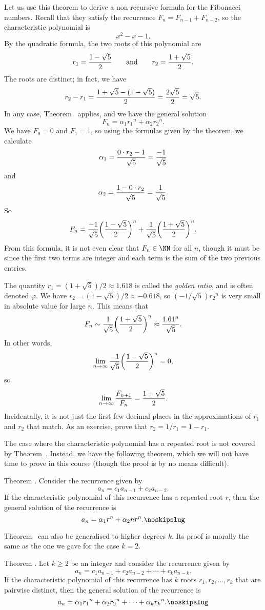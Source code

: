 Let us use this theorem to derive a non-recursive formula for the Fibonacci numbers.
Recall that they satisfy the recurrence $F_n = F_{n-1} + F_{n-2}$, so the characteristic
polynomial is
$$x^2 - x - 1.$$
By the quadratic formula, the two roots of this polynomial are
$$r_1 = {1 - \sqrt 5\over 2}\qquad\hbox{and}\qquad r_2 = {1+\sqrt 5\over 2}.$$
The roots are distinct; in fact, we have
$$r_2 - r_1 = {1+\sqrt 5 - (1-\sqrt 5)\over 2} = {2\sqrt 5\over 2} = \sqrt 5.$$
In any case, Theorem~{\thmdegtwodistinct} applies, and we have the general
solution
$$F_n = \alpha_1 {r_1}^n + \alpha_2 {r_2}^n.$$
We have $F_0 = 0$ and $F_1 = 1$, so using the formulas given by the theorem,
we calculate
$$\alpha_1 = {0\cdot r_2 - 1\over \sqrt 5} = {-1\over \sqrt 5}$$
and
$$\alpha_2 = {1 - 0\cdot r_2\over \sqrt 5} = {1\over \sqrt 5}.$$
So
$$F_n = {-1\over \sqrt 5}\biggl({1 - \sqrt 5\over 2}\biggr)^n
+ {1\over \sqrt 5}\biggl({1+\sqrt 5\over 2}\biggr)^n.$$
From this formula, it is not even clear that $F_n \in \NN$ for all $n$, though it must be
since the first two terms are integer and each term is the sum of the two previous entries.

The quantity $r_1 = (1+\sqrt 5)/2\approx 1.618$ is called the {\it golden ratio}, and is
often denoted $\varphi$.
We have $r_2 = (1-\sqrt 5)/2 \approx -0.618$, so $(-1/\sqrt 5){r_2}^n$ is very small in absolute value
for large $n$.
This means that
$$ F_n \sim {1\over \sqrt 5} \biggl( {1+\sqrt 5\over 2}\biggr)^n \approx {1.61^n\over \sqrt 5}.$$
In other words,
$$\lim_{n\to\infty} {-1\over \sqrt 5}\biggl({1 - \sqrt 5\over 2}\biggr)^n = 0,$$
so
$$\lim_{n\to \infty} {F_{n+1}\over F_n} = {1+\sqrt 5\over 2}.$$
Incidentally, it is not just the first few decimal places in the approximations of $r_1$ and $r_2$
that match. As an exercise, prove that $r_2 = 1/r_1 = 1-r_1$.

The case where the characteristic polynomial has a repeated root is not covered by
Theorem~{\thmdegtwodistinct}. Instead, we have the following theorem, which we will
not have time to prove in this course (though the proof is by no means difficult).

\proclaim Theorem \advthm. Consider the recurrence given by
$$a_n = c_1 a_{n-1} + c_2 a_{n-2}.$$
If the characteristic polynomial of this recurrence has a repeated root $r$,
then the general solution of the recurrence is
$$a_n = \alpha_1 r^n + \alpha_2 nr^n.\noskipslug$$

Theorem~{\thmdegtwodistinct} can also be generalised to higher degrees $k$. Its proof is
morally the same as the one we gave for the case $k=2$.

\proclaim Theorem \advthm. Let $k\ge 2$ be an integer and consider the recurrence given by
$$a_n = c_1 a_{n-1} + c_2 a_{n-2} + \cdots + c_k a_{n-k}.$$
If the characteristic polynomial of this recurrence has $k$ roots
$r_1,r_2,\ldots, r_k$ that are pairwise distinct, then
the general solution of the recurrence is
$$a_n = \alpha_1 {r_1}^n + \alpha_2 {r_2}^n + \cdots + \alpha_k {r_k}^n.\noskipslug$$

\bye

